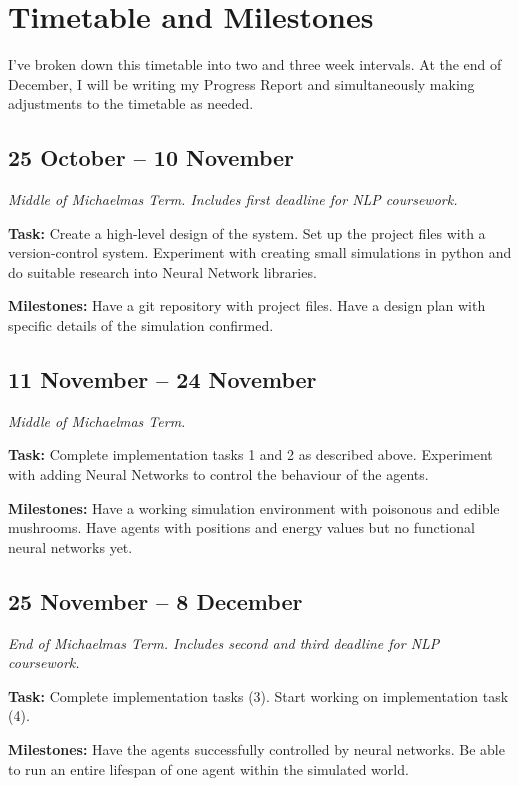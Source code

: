 \documentclass[12pt,a4paper,twoside]{article}
\begin{document}
\section*{Timetable and Milestones}

I've broken down this timetable into two and three week intervals. At the end of December, I will be writing my Progress Report and simultaneously making adjustments to the timetable as needed.

\subsection*{25 October -- 10 November}

\emph{Middle of Michaelmas Term. Includes first deadline for NLP coursework.}


{\bf Task:} Create a high-level design of the system. Set up the project files with a version-control system. Experiment with creating small simulations in python and do suitable research into Neural Network libraries.

{\bf Milestones:} Have a git repository with project files. Have a design plan with specific details of the simulation confirmed.

\subsection*{11 November -- 24 November}

\emph{Middle of Michaelmas Term.}


{\bf Task:} Complete implementation tasks 1 and 2 as described above. Experiment with adding Neural Networks to control the behaviour of the agents.

{\bf Milestones:} Have a working simulation environment with poisonous and edible mushrooms. Have agents with positions and energy values but no functional neural networks yet.

\subsection*{25 November -- 8 December}

\emph{End of Michaelmas Term. Includes second and third deadline for NLP coursework.}


{\bf Task:} Complete implementation tasks (3). Start working on implementation task (4).

{\bf Milestones:} Have the agents successfully controlled by neural networks. Be able to run an entire lifespan of one agent within the simulated world.
\end{document}
